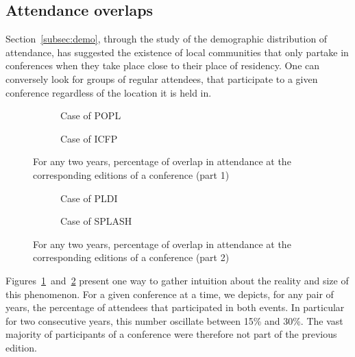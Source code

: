 \documentclass[manuscript, review, screen]{acmart}
\newcommand{\conf}{conference}
\begin{document}
\subsection{Attendance overlaps}
\label{subsec:overlap}

Section~\ref{subsec:demo}, through the study of the demographic distribution of
attendance, has suggested the existence of local communities that only
partake in conferences when they take place close to their place of residency.
One can conversely look for groups of regular attendees, that participate to a given \conf
regardless of the location it is held in.

\begin{figure}
\centering
     \begin{subfigure}[b]{0.4\textwidth}
       \centering
       \caption{Case of POPL}
     \end{subfigure}
     \hfill
     \begin{subfigure}[b]{0.4\textwidth}
       \centering
       \caption{Case of ICFP}
    \end{subfigure}

     \caption{For any two years, percentage of overlap in attendance at the corresponding editions of a conference (part 1)}
     \label{fig:overlap-conf-alpha}
\end{figure}

\begin{figure}
\centering
     \begin{subfigure}[b]{0.4\textwidth}
       \centering
       \caption{Case of PLDI}
     \end{subfigure}
     \begin{subfigure}[b]{0.4\textwidth}
       \centering
       \caption{Case of SPLASH}
     \end{subfigure}

     \caption{For any two years, percentage of overlap in attendance at the corresponding editions of a conference (part 2)}
     \label{fig:overlap-conf-beta}
\end{figure}

Figures~\ref{fig:overlap-conf-alpha}~and~\ref{fig:overlap-conf-beta} present one
way to gather intuition about the reality and size of this phenomenon. For a
given conference at a time, we depicts, for any pair of years, the percentage of
attendees that participated in both events. In particular for two consecutive
years, this number oscillate between 15\% and 30\%. The vast majority of
participants of a conference were therefore not part of the previous edition.
\end{document}
